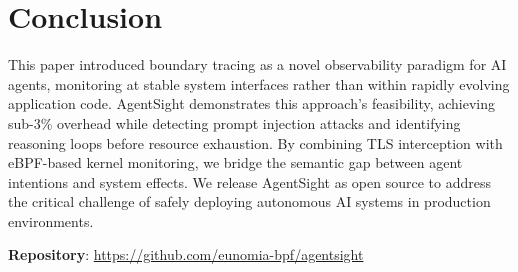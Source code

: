 

\section{Conclusion}

This paper introduced boundary tracing as a novel observability paradigm for AI agents, monitoring at stable system interfaces rather than within rapidly evolving application code. AgentSight demonstrates this approach's feasibility, achieving sub-3\% overhead while detecting prompt injection attacks and identifying reasoning loops before resource exhaustion. By combining TLS interception with eBPF-based kernel monitoring, we bridge the semantic gap between agent intentions and system effects. We release AgentSight as open source to address the critical challenge of safely deploying autonomous AI systems in production environments.

\textbf{Repository}: \url{https://github.com/eunomia-bpf/agentsight}




